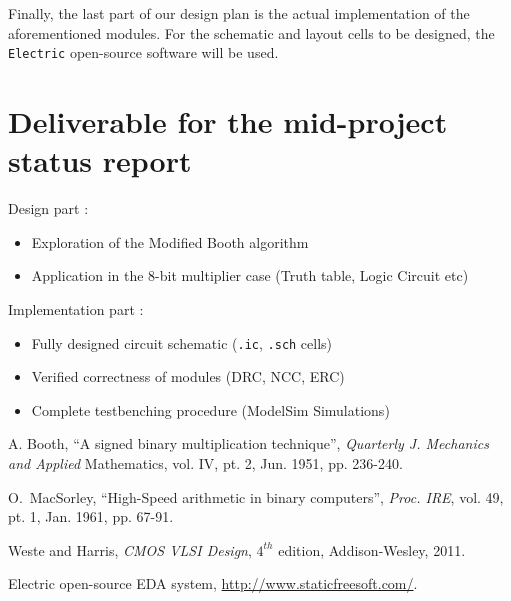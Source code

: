 \documentclass[conference]{IEEEtran}
\begin{document}
Finally, the last part of our design plan is the actual
implementation of the aforementioned modules. 
For the schematic and layout cells to be designed, 
the \texttt{Electric} open-source software \cite{electric} will 
be used. 


\section{Deliverable for the mid-project status report}

Design part :

\begin{itemize}
\item Exploration of the Modified Booth algorithm 
\item Application in the 8-bit multiplier case 
(Truth table, Logic Circuit etc)
\end{itemize}


Implementation part : 

\begin{itemize}
\item Fully designed circuit schematic (\texttt{.ic}, 
\texttt{.sch} cells)
\item Verified correctness of modules (DRC, NCC, ERC)
\item Complete testbenching procedure (ModelSim Simulations) 
\end{itemize}







\begin{thebibliography}{1}

A. Booth, ``A signed binary multiplication technique'', 
\emph{Quarterly J. Mechanics and Applied}
Mathematics, vol. IV, pt. 2, Jun. 1951, pp. 236-240.

O.~MacSorley, ``High-Speed arithmetic in binary computers'', 
\emph{Proc. IRE}, vol. 49, pt. 1, Jan. 1961, pp. 67-91.

Weste and Harris, \emph{CMOS VLSI Design}, $4^{th}$ edition, Addison-Wesley, 2011.	

Electric open-source EDA system,
\href{http://www.staticfreesoft.com/}{http://www.staticfreesoft.com/}.


\end{thebibliography}

\end{document}
